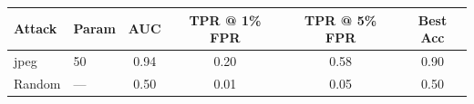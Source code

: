 \begin{tabular}{llcccc}
\toprule
Attack & Param & AUC & TPR @ 1\% FPR & TPR @ 5\% FPR & Best Acc \\
\midrule
jpeg & 50 & 0.94 & 0.20 & 0.58 & 0.90 \\
Random & — & 0.50 & 0.01 & 0.05 & 0.50 \\
\bottomrule
\end{tabular}
